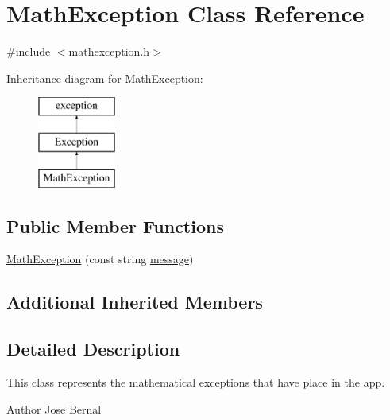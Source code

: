 \hypertarget{classMathException}{\section{Math\-Exception Class Reference}
\label{classMathException}
}


{\ttfamily \#include $<$mathexception.\-h$>$}

Inheritance diagram for Math\-Exception\-:\begin{figure}[H]
\begin{center}
\leavevmode
\includegraphics[height=3.000000cm]{classMathException}
\end{center}
\end{figure}
\subsection*{Public Member Functions}
\begin{DoxyCompactItemize}
\item 
\hyperlink{classMathException_aa4254eabcd2e2f9b2bfd90f9fb6280c2}{Math\-Exception} (const string \hyperlink{classException_a3d5051a55e7133196d3097a5cd2d58a7}{message})
\end{DoxyCompactItemize}
\subsection*{Additional Inherited Members}


\subsection{Detailed Description}
This class represents the mathematical exceptions that have place in the app.

\begin{DoxyAuthor}{Author}
Jose Bernal 
\end{DoxyAuthor}


